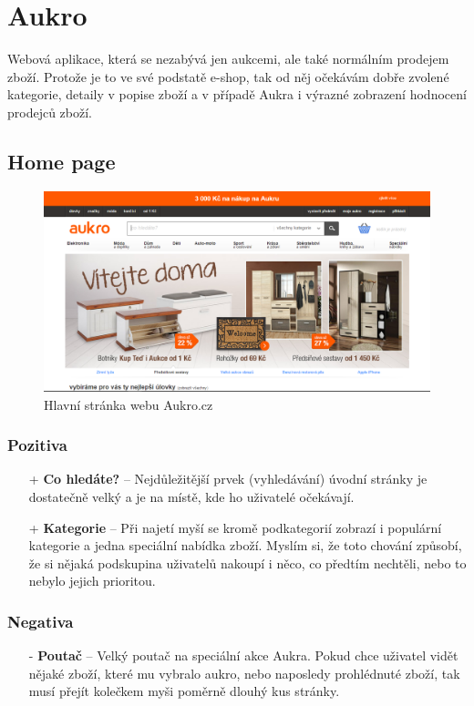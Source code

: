 \section{Aukro}

\label{analyza:aukro}

Webová aplikace, která se nezabývá jen aukcemi, ale také normálním prodejem zboží. Protože je to ve své podstatě e-shop, tak od něj očekávám dobře zvolené kategorie, detaily v popise zboží a v případě Aukra i výrazné zobrazení hodnocení prodejců zboží.

\subsection{Home page}
\begin{figure}[h]
    \centering
    \includegraphics[width=1.0\textwidth]{media/aukro/home.png}
    \caption{Hlavní stránka webu Aukro.cz}
    \label{fig:aukro:home}
\end{figure}
\subsubsection*{Pozitiva}
\begin{itemize}
    \item[+] \textbf{Co hledáte?} -- Nejdůležitější prvek (vyhledávání) úvodní stránky je dostatečně velký a je na místě, kde ho uživatelé očekávají.
    \item[+] \textbf{Kategorie} -- Při najetí myší se kromě podkategorií zobrazí i populární kategorie a jedna speciální nabídka zboží. Myslím si, že toto chování způsobí, že si nějaká podskupina uživatelů nakoupí i něco, co předtím nechtěli, nebo to nebylo jejich prioritou.
\end{itemize}
\subsubsection*{Negativa}
\begin{itemize}
    \item[-] \textbf{Poutač} -- Velký poutač na speciální akce Aukra. Pokud chce uživatel vidět nějaké zboží, které mu vybralo aukro, nebo naposledy prohlédnuté zboží, tak musí přejít kolečkem myši poměrně dlouhý kus stránky.
\end{itemize}


